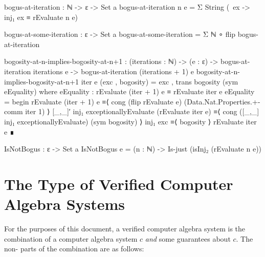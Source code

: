 \documentclass{report}
\begin{document}
\begin{code}
  bogus-at-iteration : ℕ -> ε -> Set a
  bogus-at-iteration n e = Σ String (\ ex -> inj₁ ex ≡ rEvaluate n e)

  bogus-at-some-iteration : ε -> Set a
  bogus-at-some-iteration = Σ ℕ ∘ flip bogus-at-iteration

  bogosity-at-n-implies-bogosity-at-n+1 :
    (iterations : ℕ) ->
    (e : ε) ->
    bogus-at-iteration iterations e ->
    bogus-at-iteration (iterations + 1) e
  bogosity-at-n-implies-bogosity-at-n+1 iter e (exc , bogosity) =
    exc , trans bogosity (sym eEquality)
    where
    eEquality : rEvaluate (iter + 1) e ≡ rEvaluate iter e
    eEquality = begin
      rEvaluate (iter + 1) e
        ≡⟨ cong (flip rEvaluate e) (Data.Nat.Properties.+-comm iter 1) ⟩
      [_,_]′ inj₁ exceptionallyEvaluate (rEvaluate iter e)
        ≡⟨ cong ([_,_] inj₁ exceptionallyEvaluate) (sym bogosity) ⟩
      inj₁ exc
        ≡⟨ bogosity ⟩
      rEvaluate iter e ∎

  IsNotBogus : ε -> Set a
  IsNotBogus e = (n : ℕ) -> Is-just (isInj₂ (rEvaluate n e))
\end{code}

\section{The Type of Verified Computer Algebra Systems}
For the purposes of this document, a verified computer algebra system is the combination of a  computer algebra system \(c\) \emph{and} some guarantees about \(c\).  The non- parts of the combination are as follows:
\end{document}
